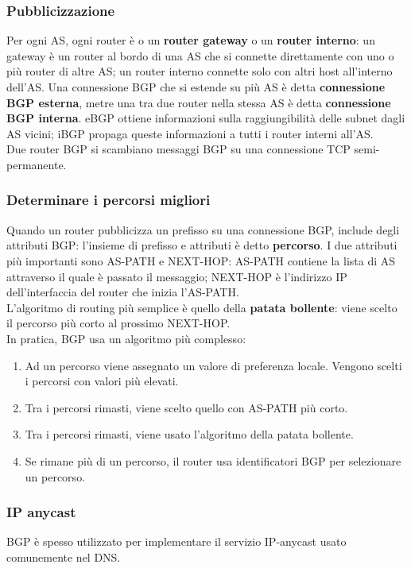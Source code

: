 \documentclass[11pt]{article}
\begin{document}
\subsubsection{Pubblicizzazione}
Per ogni AS, ogni router è o un \textbf{router gateway} o un \textbf{router interno}: un gateway è un router al bordo di una AS che si connette 
direttamente con uno o più router di altre AS; un router interno connette solo con altri host all'interno dell'AS.
Una connessione BGP che si estende su più AS è detta \textbf{connessione BGP esterna}, metre una tra due router nella stessa 
AS è detta \textbf{connessione BGP interna}. eBGP ottiene informazioni sulla raggiungibilità delle subnet dagli AS vicini; 
iBGP propaga queste informazioni a tutti i router interni all'AS.\\
Due router BGP si scambiano messaggi BGP su una connessione TCP semi-permanente.
\subsubsection{Determinare i percorsi migliori}
Quando un router pubblicizza un prefisso su una connessione BGP, include degli attributi BGP: l'insieme di prefisso e attributi 
è detto \textbf{percorso}. I due attributi più importanti sono AS-PATH e NEXT-HOP: AS-PATH contiene la lista di AS attraverso 
il quale è passato il messaggio; NEXT-HOP è l'indirizzo IP dell'interfaccia del router che inizia l'AS-PATH.\\
L'algoritmo di routing più semplice è quello della \textbf{patata bollente}: viene scelto il percorso più corto al prossimo 
NEXT-HOP.\\
In pratica, BGP usa un algoritmo più complesso:
\begin{enumerate}
    \item Ad un percorso viene assegnato un valore di preferenza locale. Vengono scelti i percorsi con valori più elevati.
    \item Tra i percorsi rimasti, viene scelto quello con AS-PATH più corto.
    \item Tra i percorsi rimasti, viene usato l'algoritmo della patata bollente.
    \item Se rimane più di un percorso, il router usa identificatori BGP per selezionare un percorso.
\end{enumerate}
\subsubsection{IP anycast}
BGP è spesso utilizzato per implementare il servizio IP-anycast usato comunemente nel DNS. 
\end{document}
